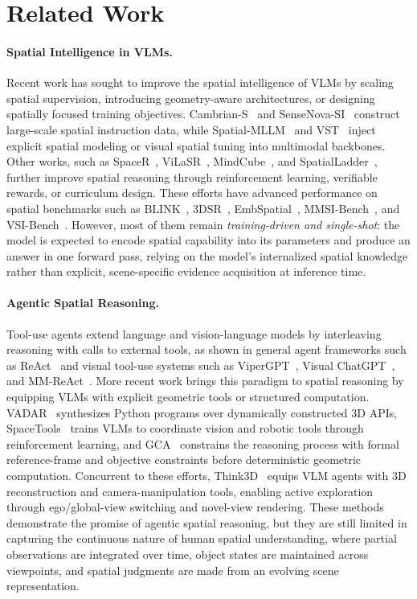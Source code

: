 \section{Related Work}
\label{sec:related}

\paragraph{Spatial Intelligence in VLMs.}
Recent work has sought to improve the spatial intelligence of VLMs by scaling spatial supervision, introducing geometry-aware architectures, or designing spatially focused training objectives. 
Cambrian-S~\citep{cambrian_s} and SenseNova-SI~\citep{sensenova_si} construct large-scale spatial instruction data, while Spatial-MLLM~\citep{spatial_mllm} and VST~\citep{vst} inject explicit spatial modeling or visual spatial tuning into multimodal backbones. 
Other works, such as SpaceR~\citep{spacer}, ViLaSR~\citep{vilasr}, MindCube~\citep{mindcube}, and SpatialLadder~\citep{spatialladder}, further improve spatial reasoning through reinforcement learning, verifiable rewards, or curriculum design. 
These efforts have advanced performance on spatial benchmarks such as BLINK~\citep{blink}, 3DSR~\citep{threedsr}, EmbSpatial~\citep{embspatial}, MMSI-Bench~\citep{mmsi_bench}, and VSI-Bench~\citep{vsi_bench}. 
However, most of them remain \textit{training-driven and single-shot}: the model is expected to encode spatial capability into its parameters and produce an answer in one forward pass, relying on the model's internalized spatial knowledge rather than explicit, scene-specific evidence acquisition at inference time.


\paragraph{Agentic Spatial Reasoning.}
Tool-use agents extend language and vision-language models by interleaving reasoning with calls to external tools, as shown in general agent frameworks such as ReAct~\citep{react} and visual tool-use systems such as ViperGPT~\citep{vipergpt}, Visual ChatGPT~\citep{visual_chatgpt}, and MM-ReAct~\citep{mm_react}. 
More recent work brings this paradigm to spatial reasoning by equipping VLMs with explicit geometric tools or structured computation. 
VADAR~\citep{vadar} synthesizes Python programs over dynamically constructed 3D APIs, SpaceTools~\citep{spacetools} trains VLMs to coordinate vision and robotic tools through reinforcement learning, and GCA~\citep{gca} constrains the reasoning process with formal reference-frame and objective constraints before deterministic geometric computation. 
Concurrent to these efforts, Think3D~\citep{zhang2026think3d} equips VLM agents with 3D reconstruction and camera-manipulation tools, enabling active exploration through ego/global-view switching and novel-view rendering. 
These methods demonstrate the promise of agentic spatial reasoning, but they are still limited in capturing the continuous nature of human spatial understanding, where partial observations are integrated over time, object states are maintained across viewpoints, and spatial judgments are made from an evolving scene representation.

